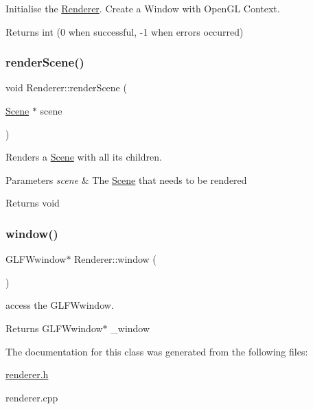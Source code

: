 Initialise the \hyperlink{class_renderer}{Renderer}. Create a Window with Open\+GL Context. 

\begin{DoxyReturn}{Returns}
int (0 when successful, -\/1 when errors occurred) 
\end{DoxyReturn}
\mbox{\label{class_renderer_a6dc601fc4faf3ab41bd212f6f31eaf89}} 
\subsubsection{\texorpdfstring{render\+Scene()}{renderScene()}}
{\footnotesize\ttfamily void Renderer\+::render\+Scene (\begin{DoxyParamCaption}\item[{\hyperlink{class_scene}{Scene} $\ast$}]{scene }\end{DoxyParamCaption})}



Renders a \hyperlink{class_scene}{Scene} with all its children. 


\begin{DoxyParams}{Parameters}
{\em scene} & The \hyperlink{class_scene}{Scene} that needs to be rendered \\
\hline
\end{DoxyParams}
\begin{DoxyReturn}{Returns}
void 
\end{DoxyReturn}
\mbox{\label{class_renderer_aeaa64bb33b48726eaf294827ac12bb18}} 
\subsubsection{\texorpdfstring{window()}{window()}}
{\footnotesize\ttfamily G\+L\+F\+Wwindow$\ast$ Renderer\+::window (\begin{DoxyParamCaption}{ }\end{DoxyParamCaption})\hspace{0.3cm}{\ttfamily [inline]}}



access the G\+L\+F\+Wwindow. 

\begin{DoxyReturn}{Returns}
G\+L\+F\+Wwindow$\ast$ \+\_\+window 
\end{DoxyReturn}


The documentation for this class was generated from the following files\+:\begin{DoxyCompactItemize}
\item 
\hyperlink{renderer_8h}{renderer.\+h}\item 
renderer.\+cpp\end{DoxyCompactItemize}
